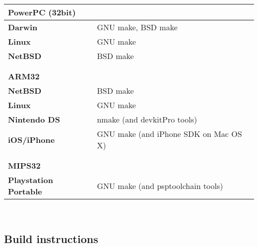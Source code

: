 \begin{tabular}{l l}
{\bf{\large PowerPC (32bit)}} &                                                      \\
\hline\hline
{\bf Darwin}                  & GNU make, BSD make                                   \\
{\bf Linux}                   & GNU make                                             \\
{\bf NetBSD}                  & BSD make                                             \\
\hline
                              &                                                      \\
                              &                                                      \\


{\bf{\large ARM32}}           &                                                      \\
\hline\hline
{\bf NetBSD}                  & BSD make                                             \\
{\bf Linux}                   & GNU make                                             \\
{\bf Nintendo DS}             & nmake (and devkitPro\cite{devkitPro} tools)          \\
{\bf iOS/iPhone}              & GNU make (and iPhone SDK on Mac OS X)                \\
\hline
                              &                                                      \\
                              &                                                      \\

{\bf{\large MIPS32}}          &                                                      \\
\hline\hline
{\bf Playstation Portable}    & GNU make (and psptoolchain\cite{psptoolchain} tools) \\
\hline

\end{tabular}\\

\pagebreak

\subsection{Build instructions}


